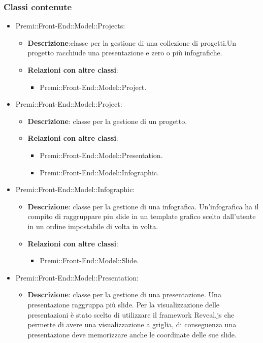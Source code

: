 	\subsubsection*{Classi contenute}
		\begin{itemize}
		 \item Premi::Front-End::Model::Projects:
			\begin{itemize}
				\item \textbf{Descrizione}:classe per la gestione di una collezione di progetti.Un progetto racchiude una presentazione e zero o più infografiche.
				\item \textbf{Relazioni con altre classi}:
				\begin{itemize}
					\item Premi::Front-End::Model::Project.
				\end{itemize}
			\end{itemize}
		\item  Premi::Front-End::Model::Project: 
			 \begin{itemize}
				\item \textbf{Descrizione}: classe per la gestione di un progetto.
				\item \textbf{Relazioni con altre classi}:
				\begin{itemize}
					\item Premi::Front-End::Model::Presentation.
					\item Premi::Front-End::Model::Infographic.
				\end{itemize}
			\end{itemize}
		 \item  Premi::Front-End::Model::Infographic:
			\begin{itemize}
				\item \textbf{Descrizione}: classe per la gestione di una \gls{infografica}. Un'\gls{infografica} ha il compito di raggruppare piu \gls{slide} in un \gls{template} grafico scelto dall'utente in un ordine impostabile di volta in volta.
				\item \textbf{Relazioni con altre classi}:
				\begin{itemize}
					\item Premi::Front-End::Model::\gls{Slide}.
				\end{itemize}
			\end{itemize}
		 \item   Premi::Front-End::Model::Presentation:
			\begin{itemize}
				\item \textbf{Descrizione}: classe per la gestione di una presentazione. Una presentazione raggruppa più \gls{slide}. Per la visualizzazione delle presentazioni è stato scelto di utilizzare il \gls{framework} \gls{Reveal.js} che permette di avere una visualizzazione a griglia, di conseguenza una presentazione deve memorizzare anche le coordinate delle sue \gls{slide}.

\end{itemize}
\end{itemize}
